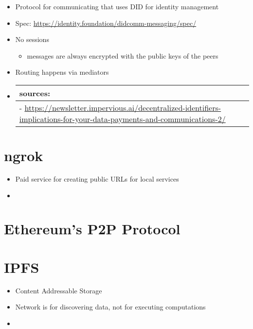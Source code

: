\begin{itemize}
\item
  Protocol for communicating that uses DID for identity management
\item
  Spec: \url{https://identity.foundation/didcomm-messaging/spec/}
\item
  No sessions

  \begin{itemize}
  \tightlist
  \item
    messages are always encrypted with the public keys of the peers
  \end{itemize}
\item
  Routing happens via mediators
\item
  \begin{longtable}[]{@{}l@{}}
  \toprule()
  sources: \\
  \midrule()
  \endhead
  -
  \url{https://newsletter.impervious.ai/decentralized-identifiers-implications-for-your-data-payments-and-communications-2/} \\
  \bottomrule()
  \end{longtable}
\end{itemize}

\hypertarget{ngrok}{%
\section{ngrok}\label{ngrok}}

\begin{itemize}
\tightlist
\item
  Paid service for creating public URLs for local services
\item
\end{itemize}

\hypertarget{ethereums-p2p-protocol}{%
\section{Ethereum's P2P Protocol}\label{ethereums-p2p-protocol}}

\hypertarget{ipfs}{%
\section{IPFS}\label{ipfs}}

\begin{itemize}
\tightlist
\item
  Content Addressable Storage
\item
  Network is for discovering data, not for executing computations
\item
\end{itemize}


